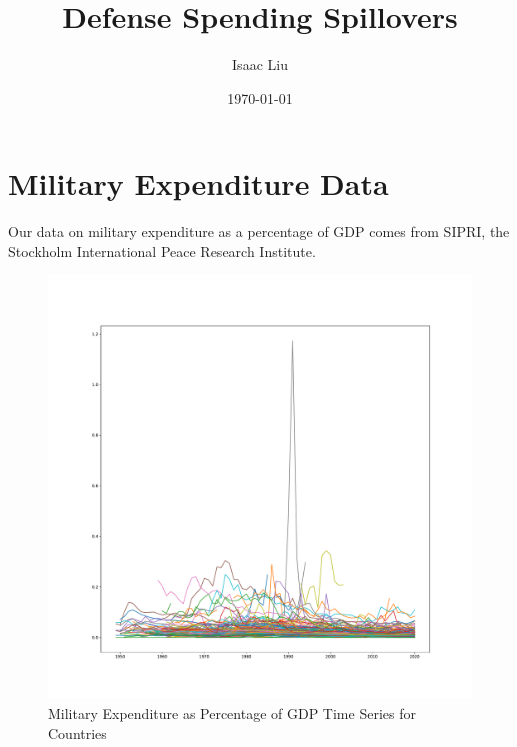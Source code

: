 \documentclass{report}
\title{Defense Spending Spillovers}
\author{Isaac Liu}
\date{\today}
\begin{document}
	\maketitle

	\newpage \clearpage

    \section*{Military Expenditure Data}

    Our data on military expenditure as a percentage of GDP comes from SIPRI, the Stockholm International
	Peace Research Institute.

	\begin{figure}[h!]
		\centering
		\caption{Military Expenditure as Percentage of GDP Time Series for Countries}
		\label{Milex_GDP_Time_Series}	
		\includegraphics[width=\linewidth,keepaspectratio=true]{../Output/Figures/Milex_GDP_Time_Series.pdf}
	\end{figure}
\end{document}
